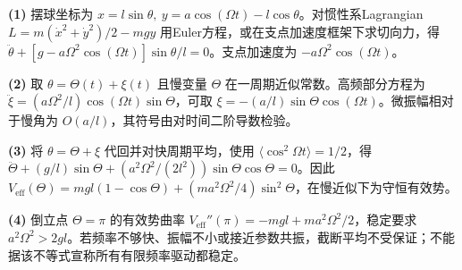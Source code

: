 \par\noindent\textbf{(1)} 摆球坐标为 \(x=l\sin\theta,\ y=a\cos(\Omega t)-l\cos\theta\)。对惯性系Lagrangian \(L=m(\dot x^2+\dot y^2)/2-mgy\) 用Euler方程，或在支点加速度框架下求切向力，得 \(\ddot\theta+[g-a\Omega^2\cos(\Omega t)]\sin\theta/l=0\)。支点加速度为 \(-a\Omega^2\cos(\Omega t)\)。
\par\noindent\textbf{(2)} 取 \(\theta=\Theta(t)+\xi(t)\) 且慢变量 \(\Theta\) 在一周期近似常数。高频部分方程为 \(\ddot\xi=(a\Omega^2/l)\cos(\Omega t)\sin\Theta\)，可取 \(\xi=-(a/l)\sin\Theta\cos(\Omega t)\)。微振幅相对于慢角为 \(O(a/l)\)，其符号由对时间二阶导数检验。
\par\noindent\textbf{(3)} 将 \(\theta=\Theta+\xi\) 代回并对快周期平均，使用 \(\langle\cos^2\Omega t\rangle=1/2\)，得 \(\ddot\Theta+(g/l)\sin\Theta+(a^2\Omega^2/(2l^2))\sin\Theta\cos\Theta=0\)。因此 \(V_{\mathrm{eff}}(\Theta)=mgl(1-\cos\Theta)+(ma^2\Omega^2/4)\sin^2\Theta\)，在慢近似下为守恒有效势。
\par\noindent\textbf{(4)} 倒立点 \(\Theta=\pi\) 的有效势曲率 \(V_{\mathrm{eff}}''(\pi)=-mgl+ma^2\Omega^2/2\)，稳定要求 \(a^2\Omega^2>2gl\)。若频率不够快、振幅不小或接近参数共振，截断平均不受保证；不能据该不等式宣称所有有限频率驱动都稳定。
